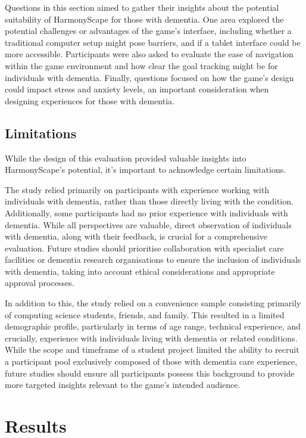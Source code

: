 \documentclass{l4proj}
\begin{document}
Questions in this section aimed to gather their insights about the potential suitability of HarmonyScape for those with dementia. One area explored the potential challenges or advantages of the game's interface, including whether a traditional computer setup might pose barriers, and if a tablet interface could be more accessible. Participants were also asked to evaluate the ease of navigation within the game environment and how clear the goal tracking might be for individuals with dementia.  Finally, questions focused on how the game's design could impact stress and anxiety levels, an important consideration when designing experiences for those with dementia.

\subsection{Limitations}
While the design of this evaluation provided valuable insights into HarmonyScape's potential, it's important to acknowledge certain limitations. 

The study relied primarily on participants with experience working with individuals with dementia, rather than those directly living with the condition. Additionally, some participants had no prior experience with individuals with dementia. While all perspectives are valuable, direct observation of individuals with dementia, along with their feedback, is crucial for a comprehensive evaluation. Future studies should prioritise collaboration with specialist care facilities or dementia research organisations to ensure the inclusion of individuals with dementia, taking into account ethical considerations and appropriate approval processes.

In addition to this, the study relied on a convenience sample consisting primarily of computing science students, friends, and family. This resulted in a limited demographic profile, particularly in terms of age range, technical experience, and crucially, experience with individuals living with dementia or related conditions. While the scope and timeframe of a student project limited the ability to recruit a participant pool exclusively composed of those with dementia care experience, future studies should ensure all participants possess this background to provide more targeted insights relevant to the game's intended audience.

\section{Results}
\end{document}
